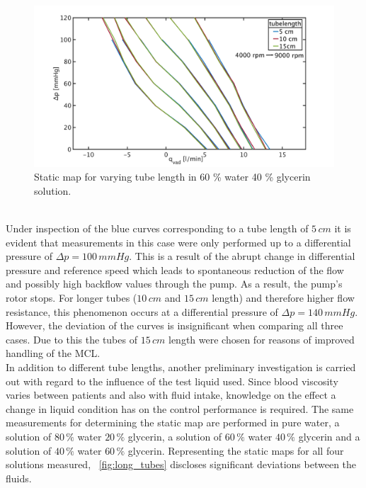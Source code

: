 \begin{figure}[ht]
  \centering
  \includegraphics[width=\textwidth]{images/chapt_4/60w40g_tube_length_new.pdf}
  \caption[Static map for different tube length in 60 \% water 40 \% glycerin solution]{Static map for varying tube length in 60 \% water 40 \% glycerin solution.}
  \label{fig:60w_40g}
\end{figure}
\\Under inspection of the blue curves corresponding to a tube length of $5\, cm$ it is evident that measurements in this case were only performed up to a differential pressure of $\Delta{p}=100 \, mmHg$. This is a result of the abrupt change in differential pressure and reference speed which leads to spontaneous reduction of the flow and possibly high backflow values through the pump. As a result, the pump's rotor stops. For longer tubes ($10\, cm$ and $15\, cm$ length) and therefore higher flow resistance, this phenomenon occurs at a differential pressure of $\Delta{p}=140\, mmHg$. However, the deviation of the curves is insignificant when comparing all three cases. Due to this the tubes of $15\, cm$ length were chosen for reasons of improved handling of the MCL.
\\In addition to different tube lengths, another preliminary investigation is carried out with regard to the influence of the test liquid used. Since blood viscosity varies between patients and also with fluid intake, knowledge on the effect a change in liquid condition has on the control performance is required. The same measurements for determining the static map are performed in pure water, a solution of $80\, \%$ water $20\, \%$ glycerin, a solution of $60\, \%$ water $40\, \%$ glycerin and a solution of $40\, \%$ water $60\, \%$ glycerin. Representing the static maps for all four solutions measured, \figurename~\ref{fig:long_tubes} discloses significant deviations between the fluids.
